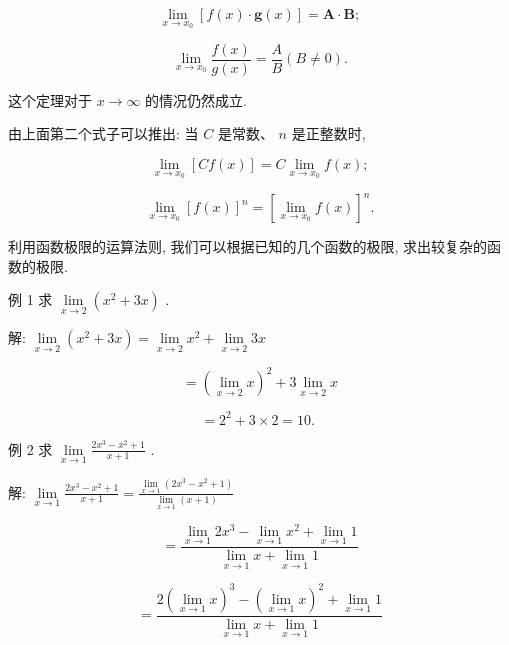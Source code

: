 \documentclass[10pt]{article}
\begin{document}
\[
\mathop{\lim }\limits_{{x \rightarrow {x}_{0}}}\left\lbrack {f\left( x\right) \cdot \mathbf{g}\left( x\right) }\right\rbrack = \mathbf{A} \cdot \mathbf{B};
\]

\[
\mathop{\lim }\limits_{{x \rightarrow {x}_{0}}}\frac{f\left( x\right) }{g\left( x\right) } = \frac{A}{B}\left( {B \neq 0}\right) .
\]

这个定理对于 \(x \rightarrow \infty\) 的情况仍然成立.

由上面第二个式子可以推出: 当 \(C\) 是常数、 \(n\) 是正整数时,

\[
\mathop{\lim }\limits_{{x \rightarrow {x}_{0}}}\left\lbrack {{Cf}\left( x\right) }\right\rbrack = C\mathop{\lim }\limits_{{x \rightarrow {x}_{0}}}f\left( x\right) ;
\]

\[
\mathop{\lim }\limits_{{x \rightarrow {x}_{0}}}{\left\lbrack f\left( x\right) \right\rbrack }^{n} = {\left\lbrack \mathop{\lim }\limits_{{x \rightarrow {x}_{0}}}f\left( x\right) \right\rbrack }^{n}.
\]

利用函数极限的运算法则, 我们可以根据已知的几个函数的极限, 求出较复杂的函数的极限.

例 1 求 \(\mathop{\lim }\limits_{{x \rightarrow 2}}\left( {{x}^{2} + {3x}}\right)\) .

解: \(\mathop{\lim }\limits_{{x \rightarrow 2}}\left( {{x}^{2} + {3x}}\right) = \mathop{\lim }\limits_{{x \rightarrow 2}}{x}^{2} + \mathop{\lim }\limits_{{x \rightarrow 2}}{3x}\)

\[
= {\left( \mathop{\lim }\limits_{{x \rightarrow 2}}x\right) }^{2} + 3\mathop{\lim }\limits_{{x \rightarrow 2}}x
\]

\[
= {2}^{2} + 3 \times 2 = {10}\text{. }
\]

例 2 求 \(\mathop{\lim }\limits_{{x \rightarrow 1}}\frac{2{x}^{3} - {x}^{2} + 1}{x + 1}\) .

解: \(\mathop{\lim }\limits_{{x \rightarrow 1}}\frac{2{x}^{3} - {x}^{2} + 1}{x + 1} = \frac{\mathop{\lim }\limits_{{x \rightarrow 1}}\left( {2{x}^{3} - {x}^{2} + 1}\right) }{\mathop{\lim }\limits_{{x \rightarrow 1}}\left( {x + 1}\right) }\)

\[
= \frac{\mathop{\lim }\limits_{{x \rightarrow 1}}2{x}^{3} - \mathop{\lim }\limits_{{x \rightarrow 1}}{x}^{2} + \mathop{\lim }\limits_{{x \rightarrow 1}}1}{\mathop{\lim }\limits_{{x \rightarrow 1}}x + \mathop{\lim }\limits_{{x \rightarrow 1}}1}
\]

\[
= \frac{2{\left( \mathop{\lim }\limits_{{x \rightarrow 1}}x\right) }^{3} - {\left( \mathop{\lim }\limits_{{x \rightarrow 1}}x\right) }^{2} + \mathop{\lim }\limits_{{x \rightarrow 1}}1}{\mathop{\lim }\limits_{{x \rightarrow 1}}x + \mathop{\lim }\limits_{{x \rightarrow 1}}1}
\]
\end{document}
